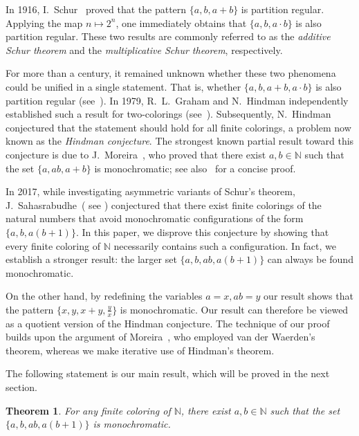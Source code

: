 \documentclass{aic}
\newtheorem{thm}{Theorem}
\begin{document}
In 1916, I.~Schur~\cite{schur} proved that the pattern \( \{a, b, a+b\} \) is partition regular. Applying the map \( n \mapsto 2^n \), one immediately obtains that \( \{a, b, a \cdot b\} \) is also partition regular. These two results are commonly referred to as the \emph{additive Schur theorem} and the \emph{multiplicative Schur theorem}, respectively.  



For more than a century, it remained unknown whether these two phenomena could be unified in a single statement. That is, whether \( \{a, b, a+b, a \cdot b\} \) is also partition regular (see~\cite{erdos}).  In 1979, R.~L.~Graham and N.~Hindman independently established such a result for two-colorings (see~\cite[Section~4]{trans}). Subsequently, N.~Hindman conjectured that the statement should hold for all finite colorings, a problem now known as the \emph{Hindman conjecture}. The strongest known partial result toward this conjecture is due to J.~Moreira~\cite{m}, who proved that there exist \( a, b \in \mathbb{N} \) such that the set \( \{a, ab, a+b\} \) is monochromatic; see also~\cite{al1} for a concise proof.  



In 2017, while investigating asymmetric variants of Schur’s theorem, J.~Sahasrabudhe~( see \cite[Question 31.]{saha}) conjectured that there exist finite colorings of the natural numbers that avoid monochromatic configurations of the form \( \{a, b, a(b+1)\} \). In this paper, we disprove this conjecture by showing that every finite coloring of \( \mathbb{N} \) necessarily contains such a configuration. In fact, we establish a stronger result: the larger set \( \{a, b, ab, a(b+1)\} \) can always be found monochromatic.  


On the other hand, by redefining the variables $a=x, ab=y$ our result shows that the pattern $\{x,y,x+y,\frac{y}{x}\}$ is monochromatic.
Our result can therefore be viewed as a quotient version of the Hindman conjecture. The technique of our proof builds upon the argument of Moreira~\cite{m}, who employed van der Waerden’s theorem, whereas we make iterative use of Hindman’s theorem.  



The following statement is our main result, which will be proved in the next section.

\begin{thm}\label{p}
For any finite coloring of \( \mathbb{N} \), there exist \( a, b \in \mathbb{N} \) such that the set \( \{a, b, ab, a(b+1)\} \) is monochromatic.
\end{thm}
\end{document}
